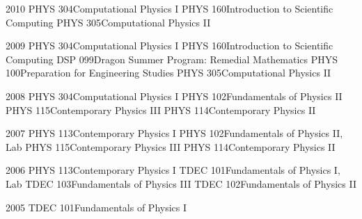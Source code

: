 \documentclass[]{scrartcl}
\begin{document}
\begin{cleanCV}
\Teaching
{2010}
{PHYS 304}{Computational Physics I\TeachingNote}
\Teaching
{}
{PHYS 160}{Introduction to Scientific Computing\TeachingNote}
\Teaching
{}
{PHYS 305}{Computational Physics II\TeachingNote}

\Teaching
{2009}
{PHYS 304}{Computational Physics I\TeachingNote}
\Teaching
{}
{PHYS 160}{Introduction to Scientific Computing\TeachingNote}
\Teaching
{}
{DSP 099}{Dragon Summer Program: Remedial Mathematics}
\Teaching
{}
{PHYS 100}{Preparation for Engineering Studies}
\Teaching
{}
{PHYS 305}{Computational Physics II\TeachingNote}

\Teaching
{2008}
{PHYS 304}{Computational Physics I\TeachingNote}
\Teaching
{}
{PHYS 102}{Fundamentals of Physics II\TeachingNote}
\Teaching
{}
{PHYS 115}{Contemporary Physics III\TeachingNote}
\Teaching
{}
{PHYS 114}{Contemporary Physics II\TeachingNote}

\Teaching
{2007}
{PHYS 113}{Contemporary Physics I\TeachingNote}
\Teaching
{}
{PHYS 102}{Fundamentals of Physics II, Lab}
\Teaching
{}
{PHYS 115}{Contemporary Physics III\TeachingNote}
\Teaching
{}
{PHYS 114}{Contemporary Physics II\TeachingNote}

\Teaching
{2006}
{PHYS 113}{Contemporary Physics I\TeachingNote}
\Teaching
{}
{TDEC 101}{Fundamentals of Physics I, Lab}
\Teaching
{}
{TDEC 103}{Fundamentals of Physics III\TeachingNote}
\Teaching
{}
{TDEC 102}{Fundamentals of Physics II\TeachingNote}

\Teaching
{2005}
{TDEC 101}{Fundamentals of Physics I\TeachingNote}


\end{cleanCV}
\end{document}

